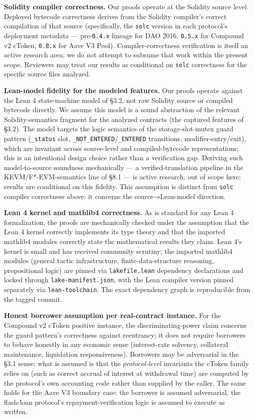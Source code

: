 \textbf{Solidity compiler correctness.} Our proofs operate at the
Solidity source level. Deployed bytecode correctness derives from the
Solidity compiler's correct compilation of that source (specifically,
the \texttt{solc} version in each protocol's deployment metadata ---
pre-\texttt{0.4.x} lineage for DAO 2016, \texttt{0.5.x} for Compound v2
cToken, \texttt{0.8.x} for Aave V3 Pool). Compiler-correctness
verification is itself an active research area; we do not attempt to
subsume that work within the present scope. Reviewers may treat our
results as conditional on \texttt{solc} correctness for the specific
source files analyzed.

\textbf{Lean-model fidelity for the modeled features.} Our proofs
operate against the Lean 4 state-machine model of §3.2, not raw Solidity
source or compiled bytecode directly. We assume this model is a sound
abstraction of the relevant Solidity-semantics fragment for the analyzed
contracts (the captured features of §3.2). The model targets the logic
semantics of the storage-slot-mutex guard pattern (\texttt{\_status}
slot, \texttt{\_NOT\_ENTERED}/\texttt{\_ENTERED} transitions,
modifier-entry/exit), which are invariant across source-level and
compiled-bytecode representations; this is an intentional design choice
rather than a verification gap. Deriving such model-to-source soundness
mechanically --- a verified-translation pipeline in the
KEVM/F*-EVM-semantics line of §8.1 --- is active research, out of scope
here; results are conditional on this fidelity. This assumption is
distinct from \texttt{solc} compiler correctness above: it concerns the
source→Lean-model direction.

\textbf{Lean 4 kernel and mathlib4 correctness.} As is standard for any
Lean 4 formalization, the proofs are mechanically checked under the
assumption that the Lean 4 kernel correctly implements its type theory
and that the imported mathlib4 modules correctly state the mathematical
results they claim. Lean 4's kernel is small and has received community
scrutiny; the imported mathlib4 modules (general tactic infrastructure,
finite-data-structure reasoning, propositional logic) are pinned via
\texttt{lakefile.lean} dependency declarations and locked through
\texttt{lake-manifest.json}, with the Lean compiler version pinned
separately via \texttt{lean-toolchain}. The exact dependency graph is
reproducible from the tagged commit.

\textbf{Honest borrower assumption per real-contract instance.} For the
Compound v2 cToken positive instance, the discriminating-power claim
concerns the guard pattern's correctness against reentrancy; it does not
require borrowers to behave honestly in any economic sense
(interest-rate solvency, collateral maintenance, liquidation
responsiveness). Borrowers may be adversarial in the §3.1 sense; what is
assumed is that the \emph{protocol-level} invariants the cToken family
relies on (such as correct accrual of interest at withdrawal time) are
computed by the protocol's own accounting code rather than supplied by
the caller. The same holds for the Aave V3 boundary case: the borrower
is assumed adversarial, the flash-loan protocol's repayment-verification
logic is assumed to execute as written.

